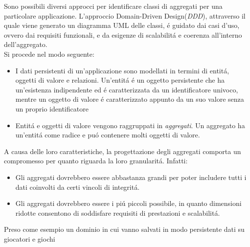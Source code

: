 Sono possibili diversi approcci per identificare classi di aggregati per una particolare applicazione.
L'approccio Domain-Driven Design(\emph{DDD}), attraverso il quale viene generato un diagramma UML delle classi,
é guidato dai casi d'uso, ovvero dai requisiti funzionali, e da esigenze di scalabilitá e coerenza all'interno dell'aggregato.\\
Si procede nel modo seguente:
\begin{itemize}
    \item I dati persistenti di un'applicazione sono modellati in termini di entitá, oggetti di valore e
    relazioni.
    Un'entitá é un oggetto persistente che ha un'esistenza indipendente ed é caratterizzata da un identificatore
    univoco, mentre un oggetto di valore é caratterizzato appunto da un suo valore senza un proprio identificatore
    \item Entitá e oggetti di valore vengono raggruppati in \emph{aggregati}.
    Un aggregato ha un'entitá come radice e puó contenere molti oggetti di valore.
\end{itemize}
A causa delle loro caratteristiche, la progettazione degli aggregati comporta un compromesso per quanto riguarda
la loro granularitá.
Infatti:
\begin{itemize}
    \item Gli aggregati dovrebbero essere abbastanza grandi per poter includere tutti i dati coinvolti da
    certi vincoli di integritá.
    \item Gli aggregati dovrebbero essere i piú piccoli possibile, in quanto dimensioni ridotte consentono di
    soddisfare requisiti di prestazioni e scalabilitá.
\end{itemize}
Preso come esempio un dominio in cui vanno salvati in modo persistente dati su giocatori e giochi

